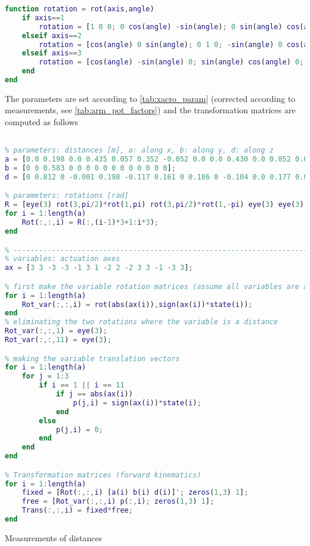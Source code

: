 \begin{lstlisting}[language=matlab]
function rotation = rot(axis,angle)
	if axis==1
		rotation = [1 0 0; 0 cos(angle) -sin(angle); 0 sin(angle) cos(angle)];
	elseif axis==2
		rotation = [cos(angle) 0 sin(angle); 0 1 0; -sin(angle) 0 cos(angle)];
	elseif axis==3
		rotation = [cos(angle) -sin(angle) 0; sin(angle) cos(angle) 0; 0 0 1];
	end
end
\end{lstlisting}

The parameters are set according to \autoref{tab:xacro_param} (corrected according to measurements, see \autoref{tab:arm_pot_factors}) and the transformation matrices are computed as follows

\begin{lstlisting}[language=matlab]
%% Existing reference frames according to xacro files

% parameters: distances [m], a: along x, b: along y, d: along z
a = [0.0 0.198 0.0 0.435 0.057 0.352 -0.052 0.0 0.0 0.430 0.0 0.052 0.0 0.0 0.0];
b = [0 0 0.583 0 0 0 0 0 0 0 0 0 0 0 0];
d = [0 0.812 0 -0.001 0.198 -0.117 0.161 0 0.186 0 -0.104 0.0 0.177 0.009 0.009];

% parameters: rotations [rad]
R = [eye(3) rot(3,pi/2)*rot(1,pi) rot(3,pi/2)*rot(1,-pi) eye(3) eye(3) eye(3) eye(3) rot(2,-0.1745) rot(2,0.1745)*rot(1,pi) rot(1,pi) eye(3) rot(3,pi/2)*rot(1,pi) eye(3) rot(2,pi/2)*rot(1,pi/2) rot(2,pi/2)*rot(1,pi/2)];
for i = 1:length(a)
	Rot(:,:,i) = R(:,(i-1)*3+1:i*3);
end

% -------------------------------------------------------------------------
% variables: actuation axes
ax = [3 3 -3 -3 -1 3 1 -2 2 -2 3 3 -1 -3 3];

% first make the variable rotation matrices (assume all variables are angles)
for i = 1:length(a)
	Rot_var(:,:,i) = rot(abs(ax(i)),sign(ax(i))*state(i));
end
% eliminating the two rotations where the variable is a distance
Rot_var(:,:,1) = eye(3);
Rot_var(:,:,11) = eye(3);

% making the variable translation vectors
for i = 1:length(a)
	for j = 1:3
		if i == 1 || i == 11
			if j == abs(ax(i)) 
				p(j,i) = sign(ax(i))*state(i);
			end
		else
			p(j,i) = 0;
		end
	end
end

% Transformation matrices (forward kinematics)
for i = 1:length(a)
	fixed = [Rot(:,:,i) [a(i) b(i) d(i)]'; zeros(1,3) 1];
	free = [Rot_var(:,:,i) p(:,i); zeros(1,3) 1];
	Trans(:,:,i) = fixed*free;
end
\end{lstlisting}

Measurements of distances

